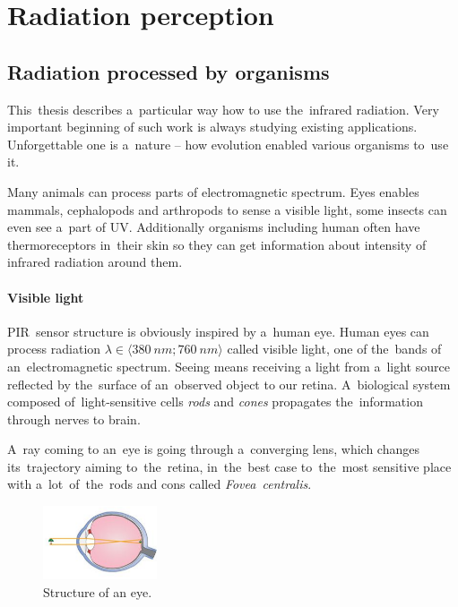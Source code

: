 \newpage
\section{Radiation perception}

\subsection*{Radiation processed by organisms}
This~thesis describes a~particular way how to use the~infrared radiation. Very important beginning of such
work is always studying existing applications. Unforgettable one is a~nature -- how evolution enabled 
various organisms to~use it.

Many animals can process parts of electromagnetic spectrum. Eyes enables mammals, cephalopods and arthropods
to sense a visible light, some insects can even see a~part of UV. Additionally organisms including human often
have thermoreceptors in~their skin so they can get information about intensity of infrared radiation around them.


\paragraph{Visible light}
\label{subsection:eye}
PIR~sensor structure is obviously inspired by a~human eye. Human eyes can process radiation
$\lambda \in \langle 380~nm;760~nm \rangle$ called visible light, one of the~bands of an~electromagnetic spectrum.
Seeing means receiving a light from a~light source reflected by the~surface of an~observed object to our retina.
A~biological system composed of~light-sensitive cells {\it rods} and {\it cones} propagates the~information
through nerves to brain.

A~ray coming to an~eye is going through a~converging lens, which changes its~trajectory aiming to~the~retina,
in~the~best case to~the~most sensitive place with a~lot~of~the~rods and cons called {\it Fovea~centralis}.
\cite{LightEyeVision}

\begin{figure}[h!]
\begin{center}
\includegraphics[width=0.3\textwidth]{img/eye.png}
\caption{Structure of an eye. \cite{Eye}\label{fig:eye}}
\end{center}    
\end{figure}


